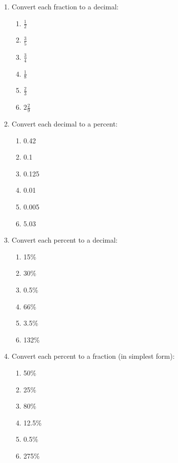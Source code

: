 \documentclass[
  letterpaper,
  DIV=11,
  numbers=noendperiod]{scrreprt}
\providecommand{\tightlist}{%
  \setlength{\itemsep}{0pt}\setlength{\parskip}{0pt}}
\begin{document}
\begin{enumerate}
\def\labelenumi{\arabic{enumi}.}
\item
  Convert each fraction to a decimal:

  \begin{enumerate}
  \def\labelenumii{\alph{enumii}.}
  \tightlist
  \item
    \(\frac{1}{2}\)
  \item
    \(\frac{3}{5}\)
  \item
    \(\frac{3}{4}\)
  \item
    \(\frac{1}{8}\)
  \item
    \(\frac{2}{3}\)
  \item
    \(2\tfrac{2}{9}\)
  \end{enumerate}
\item
  Convert each decimal to a percent:

  \begin{enumerate}
  \def\labelenumii{\alph{enumii}.}
  \tightlist
  \item
    0.42
  \item
    0.1
  \item
    0.125
  \item
    0.01
  \item
    0.005
  \item
    5.03
  \end{enumerate}
\item
  Convert each percent to a decimal:

  \begin{enumerate}
  \def\labelenumii{\alph{enumii}.}
  \tightlist
  \item
    15\%
  \item
    30\%
  \item
    0.5\%
  \item
    66\%
  \item
    3.5\%
  \item
    132\%
  \end{enumerate}
\item
  Convert each percent to a fraction (in simplest form):

  \begin{enumerate}
  \def\labelenumii{\alph{enumii}.}
  \tightlist
  \item
    50\%
  \item
    25\%
  \item
    80\%
  \item
    12.5\%
  \item
    0.5\%
  \item
    275\%
  \end{enumerate}
\end{enumerate}
\end{document}
